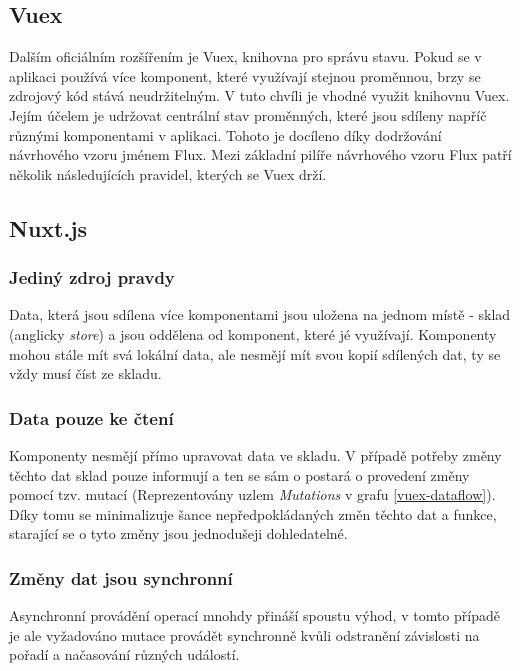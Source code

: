 \subsection{Vuex}
Dalším oficiálním rozšířením je Vuex, knihovna pro správu stavu. Pokud se v aplikaci používá více komponent, které využívají stejnou proměnnou, brzy se zdrojový kód stává neudržitelným. 
V tuto chvíli je vhodné využit knihovnu Vuex. Jejím účelem je udržovat centrální stav proměnných, které jsou sdíleny napříč různými komponentami v aplikaci. Tohoto je docíleno díky dodržování návrhového vzoru jménem Flux. Mezi základní pilíře návrhového vzoru Flux patří několik následujících pravidel, kterých se Vuex drží. 

\subsection{Nuxt.js}
\blindtext


\subsubsection*{Jediný zdroj pravdy}
Data, která jsou sdílena více komponentami jsou uložena na jednom místě - sklad (anglicky \emph{store}) a jsou oddělena od komponent, které jé využívají. Komponenty mohou stále mít svá lokální data, ale nesmějí mít svou kopií sdílených dat, ty se vždy musí číst ze skladu.

\subsubsection*{Data pouze ke čtení}
Komponenty nesmějí přímo upravovat data ve skladu. V případě potřeby změny těchto dat sklad pouze informují a ten se sám o postará o provedení změny pomocí tzv. mutací (Reprezentovány uzlem \emph{Mutations} v grafu \ref{vuex-dataflow}). Díky tomu se minimalizuje šance nepředpokládaných změn těchto dat a funkce, starající se o tyto změny jsou jednodušeji dohledatelné.


\subsubsection*{Změny dat jsou synchronní}
Asynchronní provádění operací mnohdy přináší spoustu výhod, v tomto případě je ale vyžadováno mutace provádět synchronně kvůli odstranění závislosti na pořadí a načasování různých událostí.


